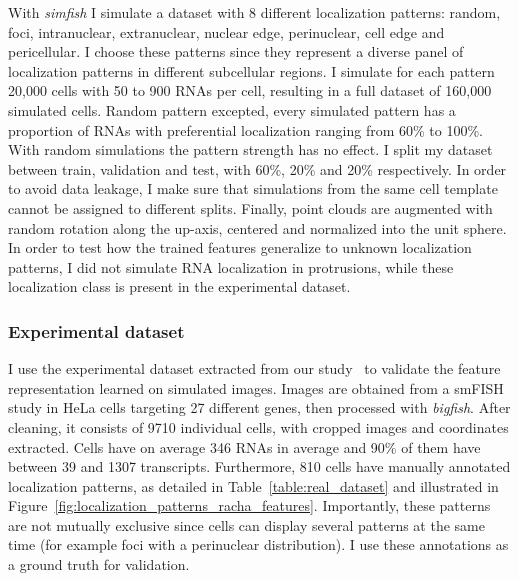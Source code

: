 With \emph{simfish} I simulate a dataset with 8 different localization patterns: random, foci, intranuclear, extranuclear, nuclear edge, perinuclear, cell edge and pericellular.
I choose these patterns since they represent a diverse panel of localization patterns in different subcellular regions.
I simulate for each pattern 20,000 cells with 50 to 900 \ac{RNA}s per cell, resulting in a full dataset of 160,000 simulated cells.
Random pattern excepted, every simulated pattern has a proportion of \ac{RNA}s with preferential localization ranging from 60\% to 100\%.
With random simulations the pattern strength has no effect.
I split my dataset between train, validation and test, with 60\%, 20\% and 20\% respectively.
In order to avoid data leakage, I make sure that simulations from the same cell template cannot be assigned to different splits.
Finally, point clouds are augmented with random rotation along the up-axis, centered and normalized into the unit sphere.
In order to test how the trained features generalize to unknown localization patterns, I did not simulate \ac{RNA} localization in protrusions, while these localization class is present in the experimental dataset.

\subsubsection{Experimental dataset}

I use the experimental dataset extracted from our study~\cite{CHOUAIB_2020} to validate the feature representation learned on simulated images.
Images are obtained from a \ac{smFISH} study in HeLa cells targeting 27 different genes, then processed with \emph{bigfish}.
After cleaning, it consists of 9710 individual cells, with cropped images and coordinates extracted.
Cells have on average 346 \ac{RNA}s in average and 90\% of them have between 39 and 1307 transcripts.
Furthermore, 810 cells have manually annotated localization patterns, as detailed in Table~\ref{table:real_dataset} and illustrated in Figure~\ref{fig:localization_patterns_racha_features}.
Importantly, these patterns are not mutually exclusive since cells can display several patterns at the same time (for example foci with a perinuclear distribution).
I use these annotations as a ground truth for validation.

